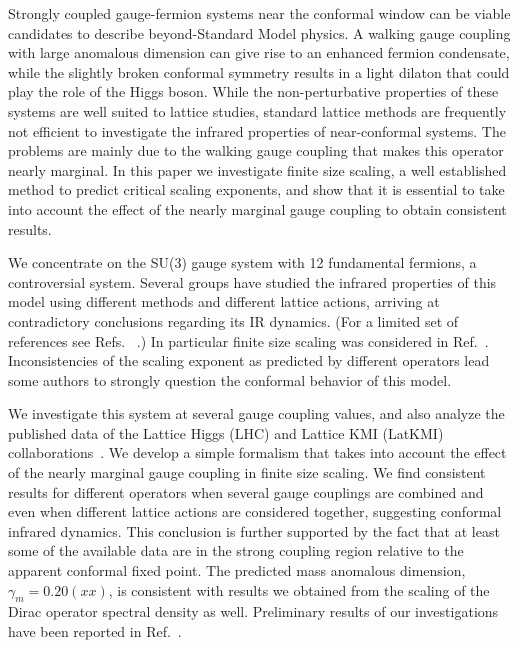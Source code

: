 \documentclass[aps,prl,twocolumn,]{revtex4}  %
\newcommand{\refcite}[1]{Ref.~\cite{#1}}
\begin{document}
Strongly coupled gauge-fermion systems near the conformal window can be viable candidates to describe beyond-Standard Model physics. A walking  gauge coupling  with large anomalous dimension can give rise to an enhanced fermion condensate,  while the slightly broken conformal symmetry results in a light dilaton that could play the role of the Higgs boson. While the  non-perturbative properties of these systems are well suited to lattice studies,   standard lattice methods are frequently not efficient to investigate the infrared properties of near-conformal systems. The problems are mainly due to  the walking gauge coupling that makes this operator nearly marginal. In this paper we investigate finite size scaling, a well established method to predict critical scaling exponents, and show that it is essential to take into account the effect of the nearly marginal gauge coupling to obtain consistent results. 

We concentrate on the SU(3) gauge system with 12 fundamental fermions,
a controversial system.
Several groups have studied the infrared properties of this model using different methods and different lattice actions, arriving at contradictory conclusions regarding its IR dynamics.
(For a limited set of references see Refs.~\cite{Appelquist:2009ty, Deuzeman:2009mh, Hasenfratz:2011xn, Fodor:2011tu, Appelquist:2011dp,DeGrand:2011cu, Cheng:2011ic, Cheng:2013eu, Fodor:2012uw, Fodor:2012et,  Aoki:2012eq, Aoki:2013pca, Itou:2012qn, Lin:2012iw, Jin:2012dw} .) In particular finite size scaling was considered in \refcite{Fodor:2011tu,Appelquist:2011dp,DeGrand:2011cu,Fodor:2012et,Aoki:2012eq}. Inconsistencies of the scaling exponent as predicted by different operators lead some authors to strongly question the conformal  behavior of this model.

We investigate this system at several gauge coupling values, and  also analyze the published data of the Lattice Higgs (LHC) and Lattice KMI (LatKMI) collaborations~\cite{Fodor:2011tu,Aoki:2012eq}. We develop a simple  formalism that  takes into account the effect of the nearly marginal gauge coupling  in finite size scaling. We find consistent results for different operators  when several gauge couplings are combined and even when different lattice actions are considered together, suggesting conformal infrared dynamics. This conclusion is further supported by the fact that at least some of the available data are in the strong coupling region relative to the apparent conformal fixed point. The predicted mass anomalous dimension, $\gamma_m=0.20(xx)$, is consistent with results we obtained from the scaling of the Dirac operator spectral density as well. Preliminary results of our investigations have been reported in \refcite{Hasenfratz:2013eka}.
\end{document}
